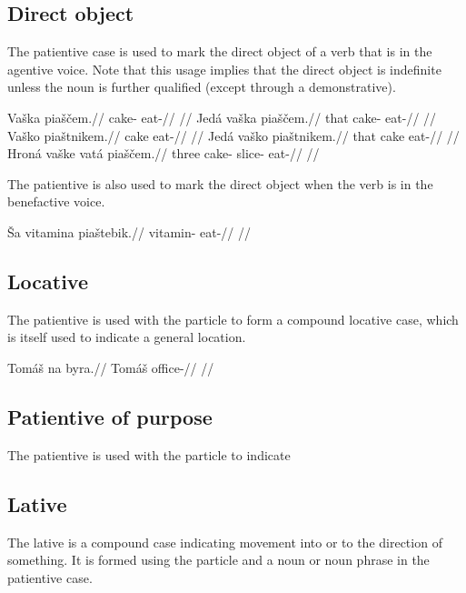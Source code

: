 \subsection{Direct object}
The patientive case is used to mark the direct object of a verb that is in the agentive voice. Note that this usage implies that the direct object is indefinite unless the noun is further qualified (except through a demonstrative).

\pex
\a
\begingl
\gla Va\v{s}ka pia\v{s}\v{c}em.//
\glb cake- eat-//
\glft {}//
\endgl
\a
\begingl
\gla Jed\'a va\v{s}ka pia\v{s}\v{c}em.//
\glb that cake- eat-//
\glft {}//
\endgl
\a
\begingl
\gla Va\v{s}ko pia\v{s}tnikem.//
\glb cake eat-//
\glft {}//
\endgl
\a
\begingl
\gla Jed\'a va\v{s}ko pia\v{s}tnikem.//
\glb that cake eat-//
\glft {}//
\endgl
\a
\begingl
\gla Hron\'a va\v{s}ke vat\'a pia\v{s}\v{c}em.//
\glb three cake- slice- eat-//
\glft {}//
\endgl
\xe

The patientive is also used to mark the direct object when the verb is in the benefactive voice.

\pex
\begingl
\gla \v{S}a vitamina pia\v{s}tebik.//
\glb {} vitamin- eat-//
\glft {}//
\endgl
\xe

\subsection{Locative}

The patientive is used with the particle  to form a compound locative case, which is itself used to indicate a general location.

\pex
\begingl
\gla Tom\'a\v{s} na byra.//
\glb Tom\'a\v{s}  office-//
\glft {}//
\endgl
\xe

\subsection{Patientive of purpose}

The patientive is used with the particle  to indicate

\subsection{Lative}
The lative is a compound case indicating movement into or to the direction of something. It is formed using the particle  and a noun or noun phrase in the patientive case.

